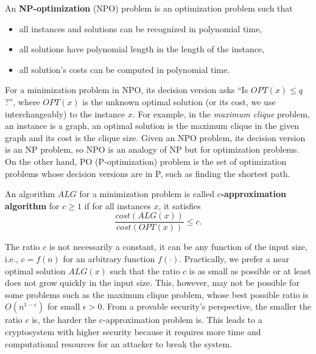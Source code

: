 \documentclass[../main.tex]{subfiles}
\begin{document}
\begin{definition}
An \textbf{NP-optimization} (NPO) problem
\reversemarginpar
{}
is an optimization problem such that 
\begin{itemize}
    \item all instances and solutions can be recognized in polynomial time,
    \item all solutions have polynomial length in the length of the instance,
    \item all solution's costs can be computed in polynomial time.
\end{itemize}
\end{definition}
For a minimization problem in NPO, its decision version asks ``Is $OPT(x) \le q$?'', where $OPT(x)$ is the unknown optimal solution (or its cost, we use interchangeably) to the instance $x$. For example, in the \textit{maximum clique} problem, an instance is a graph, an optimal solution is the maximum clique in the given graph and its cost is the clique size. Given an NPO problem, its decision version is an NP problem, so NPO is an analogy of NP but for optimization problems. On the other hand, PO (P-optimization) problem is the set of optimization problems whose decision versions are in P, such as finding the shortest path. 

\begin{definition}
An algorithm $ALG$ for a minimization problem is called \textbf{$c$-approximation algorithm}  for $c \ge 1$
\reversemarginpar
{}
if for all instances $x$, it satisfies 
\begin{equation}
    \frac{cost(ALG(x))}{cost(OPT(x))} \le c.
\end{equation}
\end{definition}
The ratio $c$ is not necessarily a constant, it can be any function of the input size, i.e., $c=f(n)$ for an arbitrary function $f(\cdot)$. Practically, we prefer a near optimal solution $ALG(x)$ such that the ratio $c$ is as small as possible or at least does not grow quickly in the input size. This, however, may not be possible for some problems such as the maximum clique problem, whose best possible ratio is $O(n^{1-\epsilon})$ for small $\epsilon > 0$. 
From a provable security's perspective, the smaller the ratio $c$ is, the harder the c-approximation problem is. This leads to a cryptosystem with higher security because it requires more time and computational resources for an attacker to break the system. 
\end{document}
